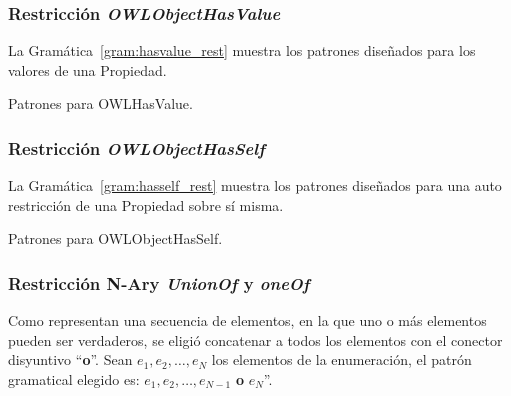 \subsubsection{Restricción \emph{OWLObjectHasValue}}
La Gramática~\ref{gram:hasvalue_rest} muestra los patrones diseñados para los valores de una Propiedad.

\begin{GrammarEnv}
\begin{grammar}
\end{grammar}
\caption{Patrones para OWLHasValue.}\label{gram:hasvalue_rest}
\end{GrammarEnv}

\subsubsection{Restricción \emph{OWLObjectHasSelf}}
La Gramática~\ref{gram:hasself_rest} muestra los patrones diseñados para una auto restricción de una Propiedad sobre sí misma.

\begin{GrammarEnv}
\begin{grammar}
\end{grammar}
\caption{Patrones para OWLObjectHasSelf.}\label{gram:hasself_rest}
\end{GrammarEnv}


\subsubsection{Restricción N-Ary \emph{UnionOf} y \emph{oneOf}} 
Como representan una secuencia de elementos, en la que uno o más elementos pueden ser verdaderos, se eligió concatenar a todos los elementos con el conector disyuntivo ``\textbf{o}''.  
Sean $e_1, e_2,\ldots,e_N$ los elementos de la enumeración, el patrón gramatical elegido es: $e_1, e_2,\ldots,e_{N-1}$ {\textbf{o}} $e_N$''.

